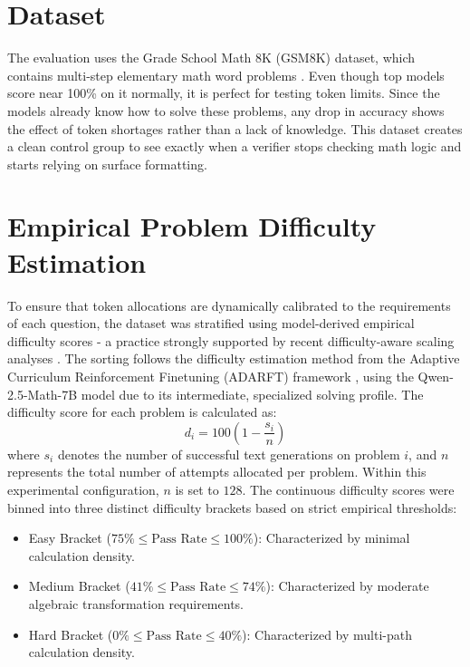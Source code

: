 \documentclass[12pt, a4paper, oneside]{report}
\begin{document}
\section{Dataset}
The evaluation uses the Grade School Math 8K (GSM8K) dataset, which contains multi-step elementary math word problems \parencite{Zhuang2026}. Even though top models score near 100\% on it normally, it is perfect for testing token limits. Since the models already know how to solve these problems, any drop in accuracy shows the effect of token shortages rather than a lack of knowledge. This dataset creates a clean control group to see exactly when a verifier stops checking math logic and starts relying on surface formatting.

\section{Empirical Problem Difficulty Estimation}
To ensure that token allocations are dynamically calibrated to the requirements of each question, the dataset was stratified using model-derived empirical difficulty scores - a practice strongly supported by recent difficulty-aware scaling analyses \parencite{Wan2026}. The sorting follows the difficulty estimation method from the Adaptive Curriculum Reinforcement Finetuning (ADARFT) framework \parencite{Shi2026}, using the Qwen-2.5-Math-7B model due to its intermediate, specialized solving profile. The difficulty score for each problem is calculated as:
\begin{equation} d_i = 100 \left(1 - \frac{s_i}{n}\right) \end{equation}
where $s_i$ denotes the number of successful text generations on problem $i$, and $n$ represents the total number of attempts allocated per problem. Within this experimental configuration, $n$ is set to $128$. The continuous difficulty scores were binned into three distinct difficulty brackets based on strict empirical thresholds:

\begin{itemize}
    \item Easy Bracket ($75\% \le \text{Pass Rate} \le 100\%$): 
    Characterized by minimal calculation density.
    \item Medium Bracket ($41\% \le \text{Pass Rate} \le 74\%$): 
    Characterized by moderate algebraic transformation requirements.
    \item Hard Bracket ($0\% \le \text{Pass Rate} \le 40\%$): 
    Characterized by multi-path calculation density.
\end{itemize}
\end{document}
